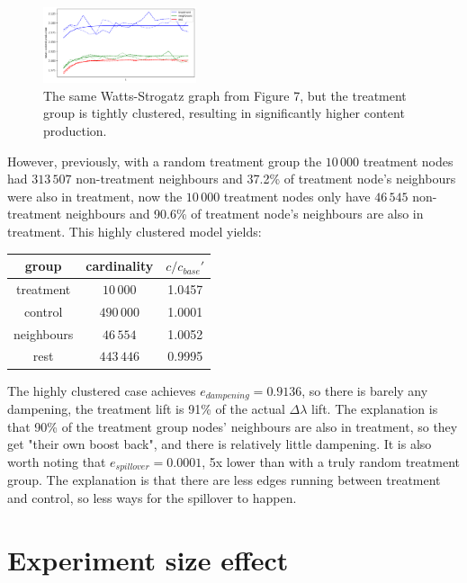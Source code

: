 \documentclass[final,5p,times,twocolumn,authoryear]{elsarticle}
\begin{document}
\begin{figure}[h]
	\centering 
	\includegraphics[width=0.4\textwidth]{figure-13.png}	
	\caption{The same Watts-Strogatz graph from Figure 7, but the treatment group is tightly clustered, resulting in significantly higher content production.} 
\end{figure}

However, previously, with a random treatment group the $10\,000$ treatment nodes had $313\,507$ non-treatment neighbours and 37.2\% of treatment node's neighbours were also in treatment, now the $10\,000$ treatment nodes only have $46\,545$ non-treatment neighbours and 90.6\% of treatment node's neighbours are also in treatment. This highly clustered model yields:

\begin{center}
\begin{tabular}{ |c|c|c| } 
 \hline
 \textbf{group} & \textbf{cardinality} & $c / c_{base}\prime$ \\ 
 \hline
 treatment   &  $10\,000$   &  1.0457 \\ 
 control     &  $490\,000$  &  1.0001 \\ 
 neighbours  &  $46\,554$   &  1.0052 \\ 
 rest        &  $443\,446$  &  0.9995 \\ 
 \hline
\end{tabular}
\end{center}

The highly clustered case achieves $e_{dampening} = 0.9136$, so there is barely any dampening, the treatment lift is 91\% of the actual $\Delta \lambda$ lift. The explanation is that 90\% of the treatment group nodes' neighbours are also in treatment, so they get "their own boost back", and there is relatively little dampening. It is also worth noting that $e_{spillover} = 0.0001$, 5x lower than with a truly random treatment group. The explanation is that there are less edges running between treatment and control, so less ways for the spillover to happen.

\section{Experiment size effect}
\end{document}
